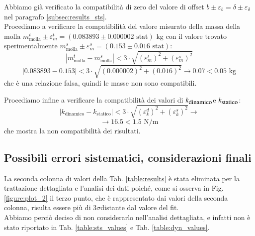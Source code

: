 \documentclass[italian, a4paper, 10pt, twocolumn]{../../style/lab_unige}
\newcommand{\reftab}[1]{Tab. {\ref{#1}}}%
\newcommand{\reffig}[1]{Fig. {\ref{#1}}}%
\newcommand{\ks}{$k_{\text{\small statico}}$\space}
\newcommand{\kd}{$k_{\text{\small dinamico}}$\space}
\newcommand{\treSigma}{$3\sigma$\space}
\begin{document}
{    Abbiamo già verificato la compatibilità di zero del valore di offset $b\pm\varepsilon_b =
    \delta\pm\varepsilon_{\delta}$
    nel paragrafo \ref{subsec:results_sts}.\\
    Procediamo a verificare la compatibilità del valore misurato della massa della molla 
    $m_{\text{molla}}^t\pm\varepsilon_m^t = (0.083893\pm0.000002\text{ stat})$ kg con il valore trovato 
    sperimentalmente $m_{\text{molla}}^s\pm\varepsilon_m^s = (0.153\pm0.016\text{ stat})$:
    \[
        \left|m_{\text{molla}}^t-m_{\text{molla}}^s\right|<3\cdot\sqrt{\left(\varepsilon_m^t\right)^2 + 
        \left(\varepsilon_m^s\right)^2}
    \]
    \[
        \left|0.083893-0.153\right|<3\cdot\sqrt{\left(0.000002\right)^2 + \left(0.016\right)^2} 
        \to 0.07<0.05\text{ kg}
    \]
    che è una relazione falsa, quindi le masse non sono compatibili.

    Procediamo infine a verificare la compatibilità dei valori di \kd e \ks:
    \[
        \left|k_{\text{dinamico}}-k_{\text{statico}}\right|<3\cdot\sqrt{\left(\varepsilon_k^d\right)^2 + 
        \left(\varepsilon_k^s\right)^2} \to
    \]
    \[
        \to 16.5<1.5 \text{ N/m}
    \]
    che mostra la non compatibilità dei risultati.

    \subsection{Possibili errori sistematici, considerazioni finali}
    La seconda colonna di valori della \reftab{table:results} è stata eliminata per la trattazione dettagliata 
    e l'analisi dei dati poiché, come si osserva in \reffig{figure:plot_2} il terzo punto, che è rappresentato dai 
    valori della seconda colonna, risulta essere più di \treSigma distante dal valore del fit.\\
    Abbiamo perciò deciso di non considerarlo nell'analisi dettagliata, e infatti non è stato riportato in 
    \reftab{table:sts_values} e \reftab{table:dyn_values}.\\

}
\end{document}
